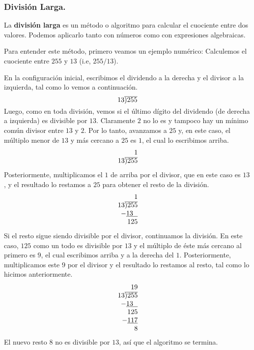 \documentclass[12pt]{article}
\begin{document}
\subsubsection{División Larga.}

La \textbf{división larga} es un método o algoritmo para calcular el cuociente entre dos valores. Podemos aplicarlo tanto con números como con expresiones algebraicas.

Para entender este método, primero veamos un ejemplo numérico: Calculemos el cuociente entre $255$ y $13$ (i.e, $255/13$).

En la configuración inicial, escribimos el dividendo a la derecha y el divisor a la izquierda, tal como lo vemos a continuación.
\[
  13 \overline{\smash{)} 255}
\]
Luego, como en toda división, vemos si el último dígito del dividendo (de derecha a izquierda) es divisible por $13$. Claramente $2$ no lo es y tampoco hay un mínimo común divisor entre $13$ y $2$. Por lo tanto, avanzamos a $25$ y, en este caso, el múltiplo menor de $13$ y más cercano a $25$ es $1$, el cual lo escribimos arriba.
\[
\begin{array}{r}
1 \\
13 \overline{\smash{)} 255}
\end{array}
\]
Posteriormente, multiplicamos el $1$ de arriba por el divisor, que en este caso es $13$, y el resultado lo restamos a $25$ para obtener el resto de la división.
\[
\begin{array}{r}
1 \\
13 \overline{\smash{)} 255} \\
- \underline{13 \text{ } \text{ }} \\
125
\end{array}
\]
Si el resto sigue siendo divisible por el divisor, continuamos la división. En este caso, $125$ como un todo es divisible por $13$ y el múltiplo de éste más cercano al primero es $9$, el cual escribimos arriba y a la derecha del $1$. Posteriormente, multiplicamos este $9$ por el divisor y el resultado lo restamos al resto, tal como lo hicimos anteriormente.
\[
\begin{array}{r}
19 \\
13 \overline{\smash{)} 255} \\
- \underline{13 \text{ } \text{ }} \\
125 \\
- \underline{117} \\
8
\end{array}
\]
El nuevo resto $8$ no es divisible por $13$, así que el algoritmo se termina.
\end{document}
